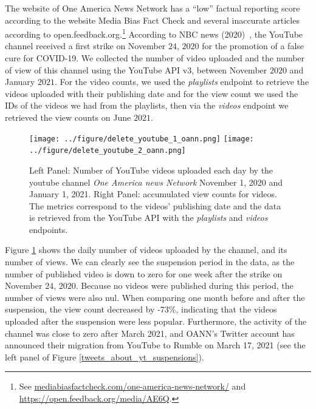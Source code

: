 \documentclass{article}
\begin{document}
\smallskip

The website of One America News Network has a ``low'' factual reporting score according to the website Media Bias Fact Check and several inaccurate articles according to open.feedback.org.\footnote{See \href{https://mediabiasfactcheck.com/one-america-news-network/}{mediabiasfactcheck.com/one-america-news-network/} and \href{https://open.feedback.org/media/AE6Q}{https://open.feedback.org/media/AE6Q}.}  
According to NBC news (2020)~\cite{nbcnews}, the YouTube channel received a first strike on November $24$, $2020$ for the promotion of a false cure for COVID-19.
We collected the number of video uploaded and the number of view of this channel using the YouTube API v3, between November $2020$ and January $2021$. For the video counts, we used the {\it playlists} endpoint to retrieve the videos uploaded with their publishing date and for the view count we used the IDs of the videos we had from the playlists, then via the {\it videos} endpoint we retrieved the view counts on June $2021$.

\begin{figure}[h]
\hspace{-2em}
		\texttt{[image: ../figure/delete\_youtube\_1\_oann.png]}
		\texttt{[image: ../figure/delete\_youtube\_2\_oann.png]} 
	\caption{Left Panel: Number of YouTube videos uploaded each day by the youtube channel {\it One America news Network} November 1, 2020 and January 1, 2021. Right Panel: accumulated view counts for videos. The metrics correspond to the videos’  publishing date and the data is retrieved from the YouTube API with the {\it playlists} and  {\it videos} endpoints. }
	\label{delete_youtube_oann}
\end{figure}

\smallskip

Figure \ref{delete_youtube_oann} shows the daily number of videos uploaded by the channel, and its number of views. 
We can clearly see the suspension period in the data, as the number of published video is down to zero for one week after the strike on November $24$, $2020$. 
Because no videos were published during this period, the number of views were also nul.
When comparing one month before and after the suspension, the view count decreased by -73\%, indicating that the videos uploaded after the suspension were less popular. 
Furthermore, the activity of the channel was close to zero after March 2021, and OANN's Twitter account has announced their migration from YouTube to Rumble on March 17, 2021 (see the left panel of Figure \ref{tweets_about_yt_suspensions}).
\end{document}
